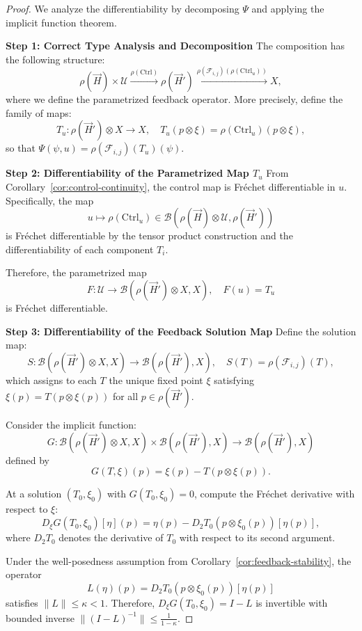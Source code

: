 \documentclass[10pt,a4paper]{amsart}
\begin{document}
\begin{proof}
We analyze the differentiability by decomposing \(\Psi\) and applying the implicit function theorem.

\medskip
\noindent\textbf{Step 1: Correct Type Analysis and Decomposition}
The composition has the following structure:
\[
\rho(\vec{H}) \times \mathcal{U} 
\xrightarrow{\rho(\mathrm{Ctrl})} 
\rho(\vec{H}')
\xrightarrow{\rho(\mathcal{F}_{i,j})(\rho(\mathrm{Ctrl}_u))} 
X,
\]
where we define the parametrized feedback operator. More precisely, define the family of maps:
\[
T_u: \rho(\vec{H}') \otimes X \to X, \quad T_u(p \otimes \xi) = \rho(\mathrm{Ctrl}_u)(p \otimes \xi),
\]
so that \(\Psi(\psi, u) = \rho(\mathcal{F}_{i,j})(T_u)(\psi)\).

\medskip
\noindent\textbf{Step 2: Differentiability of the Parametrized Map \(T_u\)}
From Corollary~\ref{cor:control-continuity}, the control map is Fr\'echet differentiable in \(u\). Specifically, the map
\[
u \mapsto \rho(\mathrm{Ctrl}_u) \in \mathcal{B}(\rho(\vec{H}) \otimes \mathcal{U}, \rho(\vec{H}'))
\]
is Fr\'echet differentiable by the tensor product construction and the differentiability of each component \(T_i\).

Therefore, the parametrized map
\[
F: \mathcal{U} \to \mathcal{B}(\rho(\vec{H}') \otimes X, X), \quad F(u) = T_u
\]
is Fr\'echet differentiable.

\medskip
\noindent\textbf{Step 3: Differentiability of the Feedback Solution Map}
Define the solution map:
\[
S: \mathcal{B}(\rho(\vec{H}') \otimes X, X) \to \mathcal{B}(\rho(\vec{H}'), X), \quad S(T) = \rho(\mathcal{F}_{i,j})(T),
\]
which assigns to each \(T\) the unique fixed point \(\xi\) satisfying \(\xi(p) = T(p \otimes \xi(p))\) for all \(p \in \rho(\vec{H}')\).

Consider the implicit function:
\[
G: \mathcal{B}(\rho(\vec{H}') \otimes X, X) \times \mathcal{B}(\rho(\vec{H}'), X) \to \mathcal{B}(\rho(\vec{H}'), X)
\]
defined by
\[
G(T, \xi)(p) = \xi(p) - T(p \otimes \xi(p)).
\]

At a solution \((T_0, \xi_0)\) with \(G(T_0, \xi_0) = 0\), compute the Fr\'echet derivative with respect to \(\xi\):
\[
D_\xi G(T_0, \xi_0)[\eta](p) = \eta(p) - D_2T_0(p \otimes \xi_0(p))[\eta(p)],
\]
where \(D_2T_0\) denotes the derivative of \(T_0\) with respect to its second argument.

Under the well-posedness assumption from Corollary~\ref{cor:feedback-stability}, the operator
\[
L(\eta)(p) = D_2T_0(p \otimes \xi_0(p))[\eta(p)]
\]
satisfies \(\|L\| \le \kappa < 1\). Therefore, \(D_\xi G(T_0, \xi_0) = I - L\) is invertible with bounded inverse \(\|(I - L)^{-1}\| \le \frac{1}{1 - \kappa}\).


\end{proof}
\end{document}
